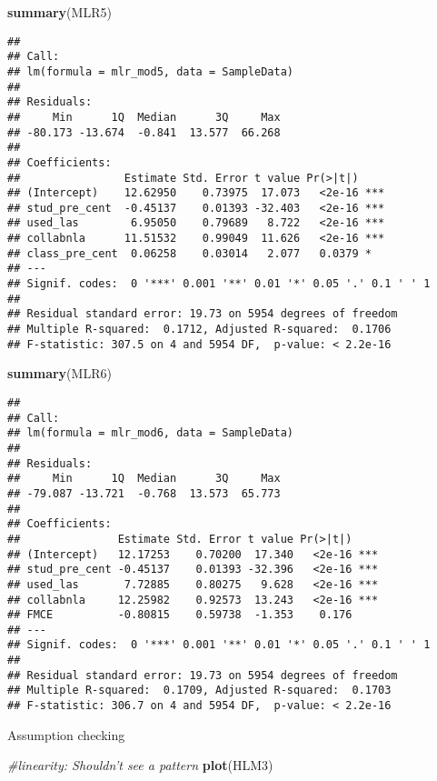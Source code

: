 \documentclass[]{article}
\newenvironment{Shaded}{\begin{snugshade}}{\end{snugshade}}
\newcommand{\KeywordTok}[1]{\textcolor[rgb]{0.13,0.29,0.53}{\textbf{#1}}}
\newcommand{\CommentTok}[1]{\textcolor[rgb]{0.56,0.35,0.01}{\textit{#1}}}
\newcommand{\NormalTok}[1]{#1}
\begin{document}
\begin{Shaded}
\begin{Highlighting}[]
\KeywordTok{summary}\NormalTok{(MLR5)}
\end{Highlighting}
\end{Shaded}

\begin{verbatim}
## 
## Call:
## lm(formula = mlr_mod5, data = SampleData)
## 
## Residuals:
##     Min      1Q  Median      3Q     Max 
## -80.173 -13.674  -0.841  13.577  66.268 
## 
## Coefficients:
##                Estimate Std. Error t value Pr(>|t|)    
## (Intercept)    12.62950    0.73975  17.073   <2e-16 ***
## stud_pre_cent  -0.45137    0.01393 -32.403   <2e-16 ***
## used_las        6.95050    0.79689   8.722   <2e-16 ***
## collabnla      11.51532    0.99049  11.626   <2e-16 ***
## class_pre_cent  0.06258    0.03014   2.077   0.0379 *  
## ---
## Signif. codes:  0 '***' 0.001 '**' 0.01 '*' 0.05 '.' 0.1 ' ' 1
## 
## Residual standard error: 19.73 on 5954 degrees of freedom
## Multiple R-squared:  0.1712, Adjusted R-squared:  0.1706 
## F-statistic: 307.5 on 4 and 5954 DF,  p-value: < 2.2e-16
\end{verbatim}

\begin{Shaded}
\begin{Highlighting}[]
\KeywordTok{summary}\NormalTok{(MLR6)}
\end{Highlighting}
\end{Shaded}

\begin{verbatim}
## 
## Call:
## lm(formula = mlr_mod6, data = SampleData)
## 
## Residuals:
##     Min      1Q  Median      3Q     Max 
## -79.087 -13.721  -0.768  13.573  65.773 
## 
## Coefficients:
##               Estimate Std. Error t value Pr(>|t|)    
## (Intercept)   12.17253    0.70200  17.340   <2e-16 ***
## stud_pre_cent -0.45137    0.01393 -32.396   <2e-16 ***
## used_las       7.72885    0.80275   9.628   <2e-16 ***
## collabnla     12.25982    0.92573  13.243   <2e-16 ***
## FMCE          -0.80815    0.59738  -1.353    0.176    
## ---
## Signif. codes:  0 '***' 0.001 '**' 0.01 '*' 0.05 '.' 0.1 ' ' 1
## 
## Residual standard error: 19.73 on 5954 degrees of freedom
## Multiple R-squared:  0.1709, Adjusted R-squared:  0.1703 
## F-statistic: 306.7 on 4 and 5954 DF,  p-value: < 2.2e-16
\end{verbatim}

Assumption checking

\begin{Shaded}
\begin{Highlighting}[]
\CommentTok{#linearity: Shouldn't see a pattern}
\KeywordTok{plot}\NormalTok{(HLM3)}
\end{Highlighting}
\end{Shaded}
\end{document}
